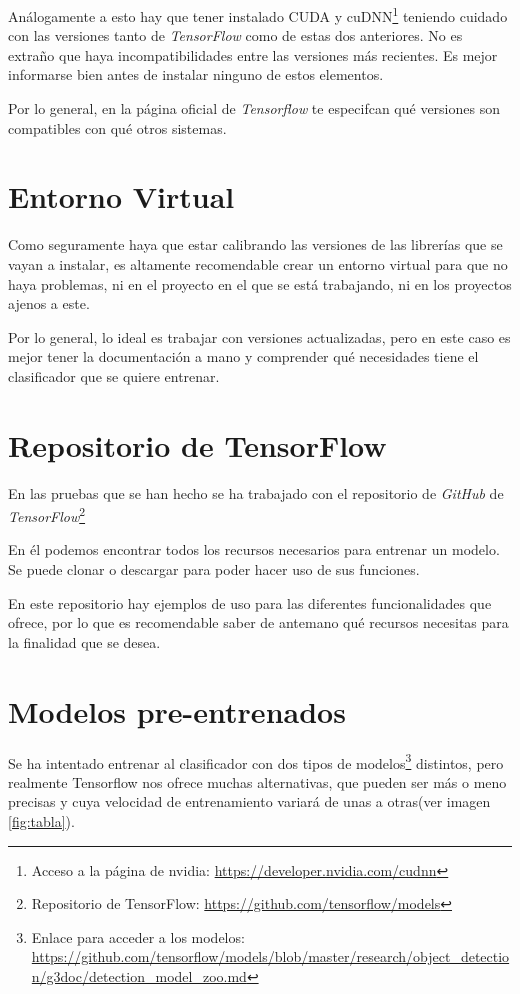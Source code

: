 Análogamente a esto hay que tener instalado CUDA y cuDNN\footnote{Acceso a la página de nvidia: \url{https://developer.nvidia.com/cudnn}} teniendo cuidado con las versiones tanto de \textit{TensorFlow} como de estas dos anteriores. No es extraño que haya incompatibilidades entre las versiones más recientes. Es mejor informarse bien antes de instalar ninguno de estos elementos.

Por lo general, en la página oficial de \textit{Tensorflow} te especifcan qué versiones son compatibles con qué otros sistemas\cite{ten}.

\section{Entorno Virtual}
Como seguramente haya que estar calibrando las versiones de las librerías que se vayan a instalar, es altamente recomendable crear un entorno virtual para que no haya problemas, ni en el proyecto en el que se está trabajando, ni en los proyectos ajenos a este.

Por lo general, lo ideal es trabajar con versiones actualizadas, pero en este caso es mejor tener la documentación a mano y comprender qué necesidades tiene el clasificador que se quiere entrenar.

\section{Repositorio de TensorFlow}
En las pruebas que se han hecho se ha trabajado con el repositorio de \textit{GitHub} de \textit{TensorFlow}\footnote{Repositorio de TensorFlow: \url{https://github.com/tensorflow/models}}

En él podemos encontrar todos los recursos necesarios para entrenar un modelo.
Se puede clonar o descargar para poder hacer uso de sus funciones.

En este repositorio hay ejemplos de uso para las diferentes funcionalidades que ofrece, por lo que es recomendable saber de antemano qué recursos necesitas para la finalidad que se desea.

\section{Modelos pre-entrenados}
Se ha intentado entrenar al clasificador con dos tipos de modelos\footnote{Enlace para acceder a los modelos: \url{https://github.com/tensorflow/models/blob/master/research/object_detection/g3doc/detection_model_zoo.md}} distintos, pero realmente Tensorflow nos ofrece muchas alternativas, que pueden ser más o meno precisas y cuya velocidad de entrenamiento variará de unas a otras(ver imagen \ref{fig:tabla}).

